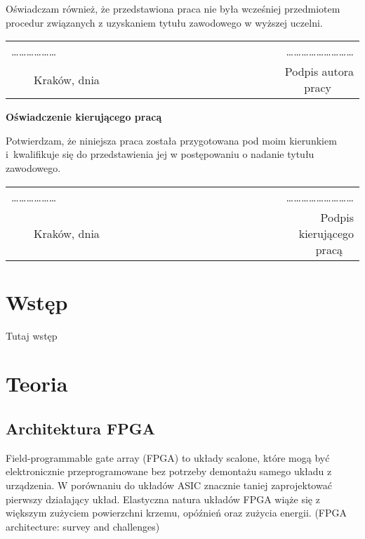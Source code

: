 \documentclass[12pt, oneside]{article}
\begin{document}
\noindent Oświadczam również, że przedstawiona praca nie była wcześniej przedmiotem procedur związanych z uzyskaniem tytułu zawodowego w wyższej uczelni.
\vspace{2cm}
\begin{center}
\begin{tabular}{lr}
\ldots\ldots\ldots\ldots\ldots\ldots~~~~~~~~~~~~~~~~~~~~~~~~~~~~~~~~~~~~~~&
\ldots\ldots\ldots\ldots\ldots\ldots\ldots\ldots\ldots \\
{~~~~Kraków, dnia} & {Podpis autora pracy~~~~}
\end{tabular}
\end{center}
\vspace{5cm}
\begin{flushleft}
\large \textbf{Oświadczenie kierującego pracą}
\end{flushleft}

\noindent Potwierdzam, że niniejsza praca została przygotowana pod moim kierunkiem i~kwalifikuje się do przedstawienia jej w postępowaniu o nadanie tytułu zawodowego.
\vspace{2cm}
\begin{center}
\begin{tabular}{lr}
\ldots\ldots\ldots\ldots\ldots\ldots~~~~~~~~~~~~~~~~~~~~~~~~~~~~~~~~~~~~~~&
\ldots\ldots\ldots\ldots\ldots\ldots\ldots\ldots\ldots \\
{~~~~Kraków, dnia} & {Podpis kierującego pracą~~}
\end{tabular}
\end{center}
\vfill

\newpage
\tableofcontents

\newpage
\section{Wstęp}
Tutaj wstęp

\newpage
\section{Teoria}
\subsection{Architektura FPGA}
Field-programmable gate array (FPGA) to układy scalone, które mogą być
elektronicznie przeprogramowane bez potrzeby demontażu samego układu
z urządzenia. W porównaniu do układów ASIC znacznie taniej zaprojektować
pierwszy działający układ. Elastyczna natura układów FPGA wiąże się z większym
zużyciem powierzchni krzemu, opóźnień oraz zużycia energii.
 (FPGA architecture: survey and challenges)
\end{document}
